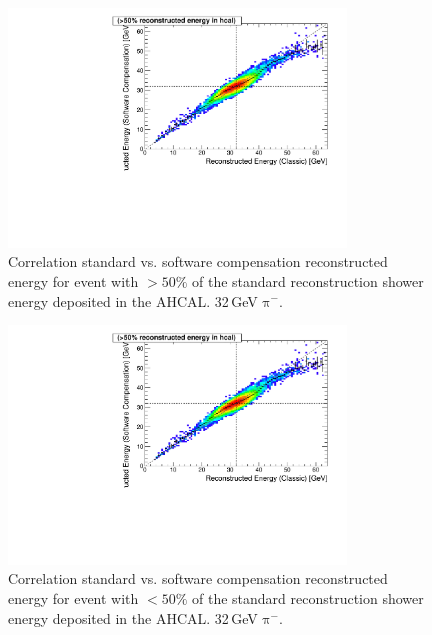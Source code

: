 \documentclass[twoside,a4paper,12pt]{article}
\newcommand\piminus{\(\mathrm{\pi^-}\)}
\begin{document}
\clearpage
\begin{figure}[t]
\begin{center}
\includegraphics[width=0.8\textwidth,page=1]{ERec_corr_jerry_560474_data}
\caption{Correlation standard vs. software compensation reconstructed energy for event with $> 50\%$ of the standard reconstruction shower energy deposited in the AHCAL. 32\,GeV \piminus.}
\label{fig:jerry1}
\end{center}
\end{figure}
\begin{figure}[b]
\begin{center}
\includegraphics[width=0.8\textwidth,page=2]{ERec_corr_jerry_560474_data}
\caption{Correlation standard vs. software compensation reconstructed energy for event with $< 50\%$ of the standard reconstruction shower energy deposited in the AHCAL. 32\,GeV \piminus.}
\label{fig:jerry2}
\end{center}
\end{figure}
\end{document}
